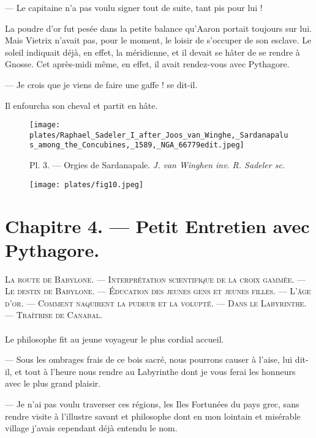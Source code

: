 \documentclass[a4paper, 11pt, oneside, polutonikogreek, french]{article}
\begin{document}
--- Le capitaine n'a pas voulu signer tout de suite, tant pis pour lui !

La poudre d'or fut pesée dans la petite balance qu'Aaron portait toujours sur lui. Mais Vietrix n'avait pas, pour le moment, le loisir de s'occuper de son esclave. Le soleil indiquait déjà, en effet, la méridienne, et il devait se hâter de se rendre à Gnosse. Cet après-midi même, en effet, il avait rendez-vous avec Pythagore.

--- Je crois que je viens de faire une gaffe ! se dit-il.

Il enfourcha son cheval et partit en hâte.
\clearpage
\begin{landscape}
\begin{figure}[H]
\centering
\texttt{[image: plates/Raphael\_Sadeler\_I\_after\_Joos\_van\_Winghe,\_Sardanapalus\_among\_the\_Concubines,\_1589,\_NGA\_66779edit.jpeg]}
\caption{Pl. 3. --- Orgies de Sardanapale. \emph{J. van Winghen inv.} \emph{R. Sadeler sc.}}
\end{figure}
\end{landscape}
\clearpage
\begin{figure}[H]
\centering
\texttt{[image: plates/fig10.jpeg]}
\end{figure}
\section{Chapitre 4. --- Petit Entretien avec Pythagore.}
\begin{center}
\scshape
\small
La route de Babylone. --- Interprétation scientifique de la croix gammée. --- Le destin de Babylone. --- Éducation des jeunes gens et jeunes filles. --- L'âge d'or. --- Comment naquirent la pudeur et la volupté. --- Dans le Labyrinthe. --- Traîtrise de Canabal.
\end{center}
\paragraph{}
Le philosophe fit au jeune voyageur le plus cordial accueil.

--- Sous les ombrages frais de ce bois sacré, nous pourrons causer à l'aise, lui dit-il, et tout à l'heure nous rendre au Labyrinthe dont je vous ferai les honneurs avec le plus grand plaisir.

--- Je n'ai pas voulu traverser ces régions, les Iles Fortunées du pays grec, sans rendre visite à l'illustre savant et philosophe dont en mon lointain et misérable village j'avais cependant déjà entendu le nom.
\end{document}

